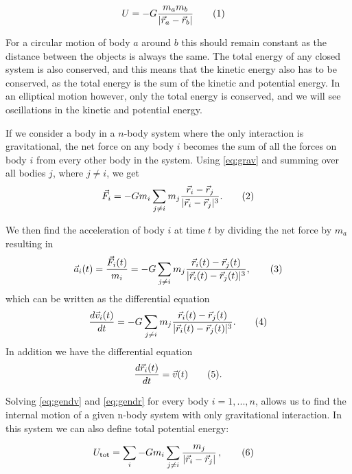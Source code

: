 \documentclass[reprint,english,notitlepage]{revtex4-1}  %
\newcommand\numberthis{\addtocounter{equation}{1}\tag{\theequation}}
\begin{document}
\begin{align*}
U &= - G \frac{m_a m_b}{|\vec{r}_a - \vec{r}_b|} \numberthis \label{eq:pot_en}
\end{align*}

For a circular motion of body $a$ around $b$ this should remain constant as the distance between the objects is always the same. The total energy of any closed system is also conserved, and this means that the kinetic energy also has to be conserved, as the total energy is the sum of the kinetic and potential energy. In an elliptical motion however, only the total energy is conserved, and we will see oscillations in the kinetic and potential energy.

If we consider a body in a \(n\)-body system where the only interaction is gravitational, the net force on any body \(i\) becomes the sum of all the forces on body \(i\) from every other body in the system. Using \eqref{eq:grav} and summing over all bodies \(j\), where \(j\neq i\), we get
\begin{align*}
	\vec{F}_{i} = -Gm_{i}\sum_{j\neq i}m_{j}\frac{\vec{r}_{i}-\vec{r}_{j}}{|\vec{r}_{i}-\vec{r}_{j}|^{3}}. \numberthis \label{eq:gengrav}
\end{align*}

We then find the acceleration of body \(i\) at time \(t\) by dividing the net force by \(m_{a}\) resulting in
\begin{align*}
	\vec{a}_{i}(t) = \frac{\vec{F}_{i}(t)}{m_{i}} = -G\sum_{j\neq i}m_{j}\frac{\vec{r}_{i}(t)-\vec{r}_{j}(t)}{|\vec{r}_{i}(t)-\vec{r}_{j}(t)|^{3}}, \numberthis \label{eq:accel}
\end{align*}
which can be written as the differential equation
\begin{align*}
 	\frac{d\vec{v}_{i}(t)}{dt} = -G\sum_{j\neq i}m_{j}\frac{\vec{r}_{i}(t)-\vec{r}_{j}(t)}{|\vec{r}_{i}(t)-\vec{r}_{j}(t)|^{3}}. \numberthis \label{eq:gendv}
\end{align*}
In addition we have the differential equation
\begin{align*}
	\frac{d\vec{r}_{i}(t)}{dt} = \vec{v}(t) \numberthis \label{eq:gendr}.
\end{align*}

Solving \eqref{eq:gendv} and \eqref{eq:gendr} for every body \(i=1, ..., n\), allows us to find the internal motion of a given n-body system with only gravitational interaction. In this system we can also define total potential energy:

\begin{align*}
U_\text{tot} &= \sum\limits_i - G m_i \sum\limits_{j\neq i} \frac{m_j}{|\vec{r}_i - \vec{r}_j|} \, , \numberthis \label{eq:tot_pot_en}
\end{align*}
\end{document}
